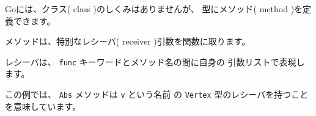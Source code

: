 Goには、クラス( class )のしくみはありませんが、
型にメソッド( method )を定義できます。

メソッドは、特別なレシーバ( receiver )引数を関数に取ります。

レシーバは、 \texttt{func} キーワードとメソッド名の間に自身の
引数リストで表現します。

この例では、 \texttt{Abs} メソッドは \texttt{v} という名前
の \texttt{Vertex} 型のレシーバを持つことを意味しています。